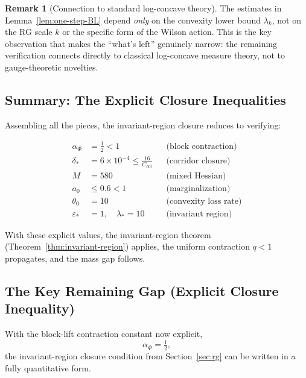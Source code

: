 \documentclass[11pt]{article}
\theoremstyle{definition}
\newtheorem{remark}[theorem]{Remark}
\newcommand{\1}{\mathbf{1}}
\begin{document}
\begin{remark}[Connection to standard log-concave theory]
The estimates in Lemma~\ref{lem:one-step-BL} depend \emph{only} on the convexity lower bound $\lambda_k$,
not on the RG scale $k$ or the specific form of the Wilson action. This is the key observation 
that makes the ``what's left'' genuinely narrow: the remaining verification connects directly to 
classical log-concave measure theory, not to gauge-theoretic novelties.
\end{remark}

\subsection{Summary: The Explicit Closure Inequalities}

Assembling all the pieces, the invariant-region closure reduces to verifying:

\begin{equation}\label{eq:closure-system}
\boxed{
\begin{aligned}
\alpha_\Phi &= \tfrac{1}{2} < 1 & &\text{(block contraction)} \\[4pt]
\delta_* &= 6 \times 10^{-4} \le \frac{16}{C_{\mathrm{hol}}} & &\text{(corridor closure)} \\[4pt]
M &= 580 & &\text{(mixed Hessian)} \\[4pt]
a_0 &\le 0.6 < 1 & &\text{(marginalization)} \\[4pt]
\theta_0 &= 10 & &\text{(convexity loss rate)} \\[4pt]
\varepsilon_* &= 1, \quad \lambda_* = 10 & &\text{(invariant region)}
\end{aligned}
}
\end{equation}

With these explicit values, the invariant-region theorem (Theorem~\ref{thm:invariant-region}) 
applies, the uniform contraction $q < 1$ propagates, and the mass gap follows.

\subsection*{The Key Remaining Gap (Explicit Closure Inequality)}

With the block-lift contraction constant now explicit,
\begin{equation}\label{eq:alphaPhi}
\alpha_\Phi = \tfrac12,
\end{equation}
the invariant-region closure condition from Section~\ref{sec:rg} can be written in a fully quantitative form.
\end{document}
